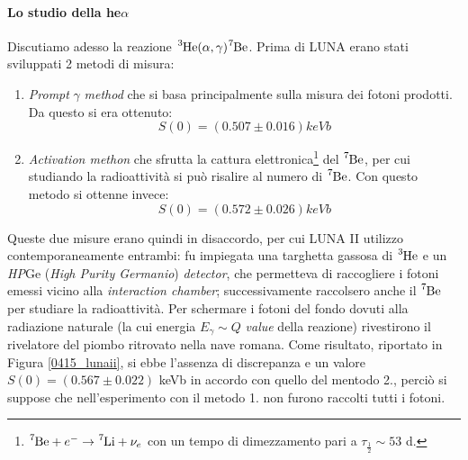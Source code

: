 \paragraph{Lo studio della he$\alpha$} Discutiamo adesso la reazione $\ce{^3He(\alpha,\gamma)\ce{^7Be}}$. Prima di LUNA erano stati sviluppati 2 metodi di misura:
\begin{enumerate}
	\item \textit{Prompt} $\gamma$ \textit{method} che si basa principalmente sulla misura dei fotoni prodotti. Da questo si era ottenuto:
	$$S(0) = (0.507 \pm 0.016) \unit{keVb}$$
	\item \textit{Activation methon} che sfrutta la cattura elettronica\footnote{$\ce{^7Be}+e^- \to \ce{^7Li} + \nu_e$ con un tempo di dimezzamento pari a $\tau_\frac{1}{2} \sim 53$ d.} del $\ce{^7Be}$, per cui studiando la radioattività si può risalire al numero di $\ce{^7Be}$. Con questo metodo si ottenne invece:
	$$S(0) = (0.572 \pm 0.026) \unit{keVb}$$
\end{enumerate} 
Queste due misure erano quindi in disaccordo, per cui LUNA II utilizzo contemporaneamente entrambi: fu impiegata una targhetta gassosa di $\ce{^3He}$ e un \textit{HP}Ge (\textit{High Purity Germanio}) \textit{detector}, che permetteva di raccogliere i fotoni emessi vicino alla \textit{interaction chamber}; successivamente raccolsero anche il $\ce{^7Be}$ per studiare la radioattività. Per schermare i fotoni del fondo dovuti alla radiazione naturale (la cui energia $E_\gamma\sim Q$ \textit{value} della reazione) rivestirono il rivelatore del piombo ritrovato nella nave romana. Come risultato, riportato in Figura \ref{0415_lunaii}, si ebbe l'assenza di discrepanza e un valore $S(0) = (0.567\pm 0.022)$ keVb in accordo con quello del mentodo 2., perciò si suppose che nell'esperimento con il metodo 1. non furono raccolti tutti i fotoni.

